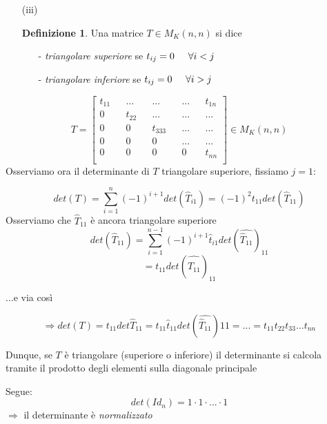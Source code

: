 \documentclass[a4paper, 12pt]{article}
\theoremstyle{definition}
\newtheorem{defn}[thm]{Definizione}
\begin{document}
\newpage

\begin{itemize}
     \item [(iii)] \begin{defn} Una matrice $T \in M_K(n,n)$ si dice \begin{itemize}
        \item [-] \textit{triangolare superiore} se $t_{ij} = 0 \hspace{0.5cm} \forall i < j$
        \item [-] \textit{triangolare inferiore} se $t_{ij} = 0 \hspace{0.5cm} \forall i > j$
     \end{itemize}
     \end{defn}
\end{itemize}

\[
T = 
\begin{bmatrix}
    t_{11} && ... && ... && ... && t_{1n} \\
    0 && t_{22} && ... && ... && ... \\
    0 && 0 && t_{333} &&  ... && ... \\
    0 && 0 && 0 &&  ... && ... \\
    0 && 0 && 0 &&  0 && t_{nn} \\
\end{bmatrix}
\in{M_{K}(n,n)}
\]
\noindent Osserviamo ora il determinante di $T$ triangolare superiore, fissiamo $j = 1$:
\smallbreak

\[
det(T) = \sum_{i=1}^{n}(-1)^{i+1}det(\hat{T}_{i1}) = (-1)^2t_{11}det(\hat{T}_{11})
\]
Osserviamo che $\hat{T}_{11}$ è ancora triangolare superiore
\[
det(\hat{T}_{11}) = \sum_{i = 1}^{n -1}(-1)^{i+1}\hat{t}_{i1}det(\widehat{\hat{T}_{11}})_{11}
\]
 \smallbreak
\[
= t_{11}det(\widehat{\hat{T}_{11}})_{11}
\]
\begin{center}
...e via così
\end{center}

\[
\Rightarrow det(T) = t_{11}det{\hat{T}_{11}} = t_{11}\hat{t}_{11}det(\widehat{\hat{T}_{11}}){11} = ... = t_{11}t_{22}t_{33}...t_{nn}
\]
\vspace{0.5cm}

\noindent Dunque, se $T$ è triangolare (superiore o inferiore) il determinante si calcola tramite il prodotto degli elementi sulla diagonale principale

 Segue:
 \[
det(Id_{n}) = 1\cdot1\cdot...\cdot1
\]   
$\Rightarrow$ il determinante è \textit{normalizzato}
\vspace{1cm}
\end{document}
